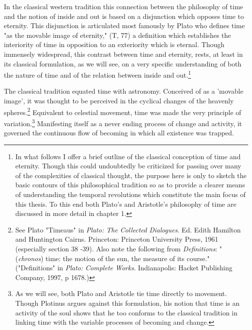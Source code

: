 In the classical western tradition this connection between the philosophy of time and the notion of inside and out is based on a disjunction which opposes time to eternity. This disjunction is articulated most famously by Plato who defines time "as the movable image of eternity," (T, 77) a definition which establishes the interiority of time in opposition to an exteriority which is eternal. Though immensely widespread, this contrast between time and eternity, rests, at least in its classical formulation, as we will see, on a very specific understanding of both the nature of time and of the relation between inside and out.\footnote{In what follows I offer a brief outline of the classical conception of time and eternity. Though this could undoubtedly be criticized for passing over many of the complexities of classical thought, the purpose here is only to sketch the basic contours of this philosophical tradition so as to provide a clearer means of understanding the temporal revolutions which constitute the main focus of this thesis. To this end both Plato's and Aristotle's philosophy of time are discussed in more detail in chapter 1.}

The classical tradition equated time with astronomy. Conceived of as a 'movable image', it was thought to be perceived in the cyclical changes of the heavenly spheres.\footnote{See Plato "Timeaus" in \textit{Plato: The Collected Dialogues}. Ed. Edith Hamilton and Huntington Cairns. Princeton: Princeton University Press, 1961 (especially section 38 -39). Also note the following from \textit{Definitions}: "(\textit{chronos}) time: the motion of the sun, the measure of its course." ("Definitions" in \textit{Plato: Complete Works}. Indianapolis: Hacket Publishing Company, 1997, p 1678.)} Equivalent to celestial movement, time was made the very principle of variation.\footnote{ As we will see, both Plato and Aristotle tie time directly to movement. Though Plotinus argues against this formulation, his notion that time is an activity of the soul shows that he too conforms to the classical tradition in linking time with the variable processes of becoming and change.} Manifesting itself as a never ending process of change and activity, it governed the continuous flow of becoming in which all existence was trapped. 

